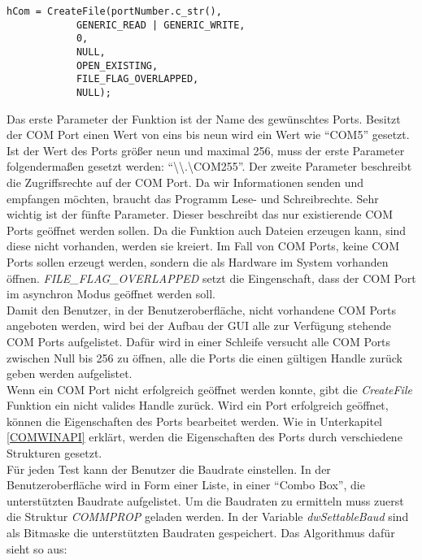 \begin{lstlisting}	 
hCom = CreateFile(portNumber.c_str(),  
            GENERIC_READ | GENERIC_WRITE,
            0, 
            NULL,
            OPEN_EXISTING, 
            FILE_FLAG_OVERLAPPED,
            NULL); 

\end{lstlisting}

Das erste Parameter der Funktion ist der Name des gewünschtes Ports. Besitzt der COM Port einen Wert von eins bis neun wird ein Wert wie "`COM5"' gesetzt. Ist der Wert des Ports größer neun und maximal 256, muss der erste Parameter folgendermaßen gesetzt werden: "`\textbackslash\textbackslash.\textbackslash COM255"'. Der zweite Parameter beschreibt die Zugriffsrechte auf der COM Port. Da wir Informationen senden und empfangen möchten, braucht das Programm Lese- und Schreibrechte. Sehr wichtig ist der fünfte Parameter. Dieser beschreibt das nur existierende COM Ports geöffnet werden sollen. Da die Funktion auch Dateien erzeugen kann, sind diese nicht vorhanden, werden sie kreiert. Im Fall von COM Ports,  keine COM Ports sollen erzeugt werden, sondern die als Hardware im System vorhanden öffnen. \textit{FILE\_FLAG\_OVERLAPPED} setzt die Eingenschaft, dass der COM Port im asynchron Modus geöffnet werden soll.\\

Damit den Benutzer, in der Benutzeroberfläche, nicht vorhandene COM Ports angeboten werden, wird bei der Aufbau der GUI alle zur Verfügung stehende COM Ports aufgelistet. Dafür wird in einer Schleife versucht alle COM Ports zwischen Null bis 256 zu öffnen, alle die Ports die einen gültigen Handle zurück geben werden aufgelistet.\\


Wenn ein COM Port nicht erfolgreich geöffnet werden konnte, gibt die \textit{CreateFile} Funktion ein nicht valides Handle zurück. Wird ein Port erfolgreich geöffnet, können die Eigenschaften des Ports bearbeitet werden. Wie in Unterkapitel \ref{COMWINAPI} erklärt, werden die Eigenschaften des Ports durch verschiedene Strukturen gesetzt.\\

Für jeden Test kann der Benutzer die Baudrate einstellen. In der Benutzeroberfläche wird in Form einer Liste, in einer "`Combo Box"', die unterstützten Baudrate aufgelistet. Um die Baudraten zu ermitteln muss zuerst die Struktur \textit{COMMPROP} geladen werden. In der Variable \textit{dwSettableBaud} sind als Bitmaske die unterstützten Baudraten gespeichert. Das Algorithmus dafür sieht so aus:

